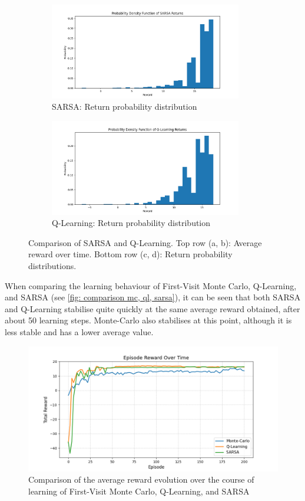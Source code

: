 \documentclass{class}
\begin{document}
\begin{figure}[H]
    \begin{subfigure}[t]{0.47\linewidth}
        \centering
        \includegraphics[height=4.2cm]{plots/return_probability/sarsa_return_probability.png}
        \caption{SARSA: Return probability distribution}
        \label{fig:sarsa_return_probability}
    \end{subfigure}
    \hspace{0.03\linewidth}
    \begin{subfigure}[t]{0.47\linewidth}
        \centering
        \includegraphics[height=4.2cm]{plots/return_probability/q_learning_return_probability.png}
        \caption{Q-Learning: Return probability distribution}
        \label{fig:qlearning_return_probability}
    \end{subfigure}

    \caption{Comparison of SARSA and Q-Learning. Top row (a, b): Average reward over time. Bottom row (c, d): Return probability distributions.}
    \label{fig:sarsa_qlearning_comparison}
\end{figure}

\noindent When comparing the learning behaviour of First-Visit Monte Carlo, Q-Learning, and SARSA (see \autoref{fig: comparison mc, ql, sarsa}), it can be seen that both SARSA and Q-Learning stabilise quite quickly at the same average reward obtained, after about 50 learning steps. Monte-Carlo also stabilises at this point, although it is less stable and has a lower average value. 

\begin{figure}[H]
    \centering
    \includegraphics[width=0.7\linewidth]{plots/comparison/comparison_plot_final.png}
    \caption{Comparison of the average reward evolution over the course of learning of First-Visit Monte Carlo, Q-Learning, and SARSA}
    \label{fig: comparison mc, ql, sarsa}
\end{figure}
\end{document}

